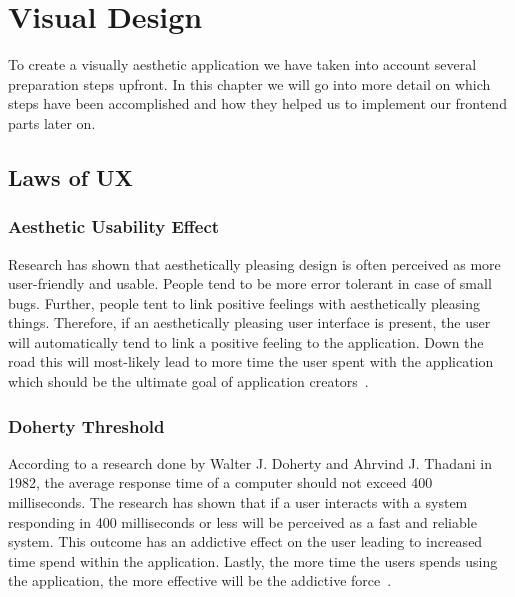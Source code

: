 \chapter{Visual Design}\label{ch:visual-design}

To create a visually aesthetic application we have taken into account several preparation steps upfront. In this chapter
we will go into more detail on which steps have been accomplished and how they helped us to implement our frontend parts
later on.

\section{Laws of UX}\label{sec:laws-of-ux}

\subsection{Aesthetic Usability Effect}\label{subsec:aestetic-usability-effect}

Research has shown that aesthetically pleasing design is often perceived as more user-friendly and usable.
People tend to be more error tolerant in case of small bugs.
Further, people tent to link positive feelings with aesthetically pleasing things.
Therefore, if an aesthetically pleasing user interface is present, the user will automatically tend to link a positive
feeling to the application.
Down the road this will most-likely lead to more time the user spent with the application which should be the ultimate
goal of application creators~\cite{lawsofuxAUE}.

\subsection{Doherty Threshold}\label{subsec:doherty-threshold}
According to a research done by Walter J. Doherty and Ahrvind J. Thadani in 1982, the average response time of a
computer should not exceed 400 milliseconds.
The research has shown that if a user interacts with a system responding in 400 milliseconds or less will be perceived
as a fast and reliable system.
This outcome has an addictive effect on the user leading to increased time spend within the application.
Lastly, the more time the users spends using the application, the more effective will be the addictive
force~\cite{lawsofuxDT}.

